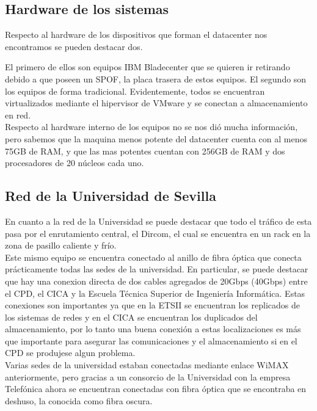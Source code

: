 \documentclass[a4paper,11pt]{article}
\begin{document}
\subsection{Hardware de los sistemas}
Respecto al hardware de los dispositivos que forman el datacenter nos encontramos se pueden destacar dos.

El primero de ellos son equipos IBM Bladecenter que se quieren ir retirando debido a que poseen un SPOF, la placa trasera de estos equipos. El segundo son los equipos de forma tradicional. Evidentemente, todos se encuentran virtualizados mediante el hipervisor de VMware y se conectan a almacenamiento en red.\\

Respecto al hardware interno de los equipos no se nos dió mucha información, pero sabemos que la maquina menos potente del datacenter cuenta con al menos 75GB de RAM, y que las mas potentes cuentan con 256GB de RAM y dos procesadores de 20 núcleos cada uno.

\subsection{Red de la Universidad de Sevilla}\label{sec:red}
En cuanto a la red de la Universidad se puede destacar que todo el tráfico de esta pasa por el enrutamiento central, el Dircom, el cual se encuentra en un rack en la zona de pasillo caliente y frío.\\

Este mismo equipo se encuentra conectado al anillo de fibra óptica que conecta prácticamente todas las sedes de la universidad. En particular, se puede destacar que hay una conexion directa de dos cables agregados de 20Gbps (40Gbps) entre el CPD, el CICA y la Escuela Técnica Superior de Ingeniería Informática. Estas conexiones son importantes ya que en la ETSII se encuentran los replicados de los sistemas de redes y en el CICA se encuentran los duplicados del almacenamiento, por lo tanto una buena conexión a estas localizaciones es más que importante para asegurar las comunicaciones y el almacenamiento si en el CPD se produjese algun problema.\\

Varias sedes de la universidad estaban conectadas mediante enlace WiMAX anteriormente, pero gracias a un consorcio de la Universidad con la empresa Telefónica ahora se encuentran conectadas con fibra óptica que se encontraba en deshuso, la conocida como fibra oscura.\\
\end{document}
